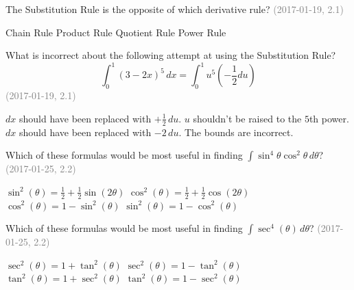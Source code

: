 \documentclass[12pt]{exam}
\newcommand{\questionDate}[1]{\textcolor{gray}{(#1)}}
\newcommand{\<}{\langle}
\renewcommand{\>}{\rangle}
\begin{document}
\begin{questions}

  \question
  The Substitution Rule is the opposite of which derivative rule?
  \questionDate{2017-01-19, 2.1}
  \begin{choices}
    \CorrectChoice Chain Rule
    \choice Product Rule
    \choice Quotient Rule
    \choice Power Rule
  \end{choices}

  \question
  What is incorrect about the following attempt at using the Substitution Rule?
  \[
    \int_0^1 (3-2x)^5\,dx = \int_0^1 u^5 \left(-\frac{1}{2}du\right)
  \]
  \questionDate{2017-01-19, 2.1}
  \begin{choices}
    \choice \(dx\) should have been replaced with \(+\frac{1}{2}\,du\).
    \choice \(u\) shouldn't be raised to the \(5\)th power.
    \choice \(dx\) should have been replaced with \(-2\,du\).
    \CorrectChoice The bounds are incorrect.
  \end{choices}





  \newpage

  \question
  Which of these formulas would be most useful in finding
  \(\int\sin^4\theta\cos^2\theta\,d\theta\)?
  \questionDate{2017-01-25, 2.2}
  \begin{choices}
    \choice \(\sin^2(\theta)=\frac{1}{2}+\frac{1}{2}\sin(2\theta)\)
    \CorrectChoice \(\cos^2(\theta)=\frac{1}{2}+\frac{1}{2}\cos(2\theta)\)
    \choice \(\cos^2(\theta)=1-\sin^2(\theta)\)
    \choice \(\sin^2(\theta)=1-\cos^2(\theta)\)
  \end{choices}

  \question
  Which of these formulas would be most useful in finding
  \(\int\sec^4(\theta)\,d\theta\)?
  \questionDate{2017-01-25, 2.2}
  \begin{choices}
    \CorrectChoice \(\sec^2(\theta)=1+\tan^2(\theta)\)
    \choice \(\sec^2(\theta)=1-\tan^2(\theta)\)
    \choice \(\tan^2(\theta)=1+\sec^2(\theta)\)
    \choice \(\tan^2(\theta)=1-\sec^2(\theta)\)
  \end{choices}

\end{questions}
\end{document}
